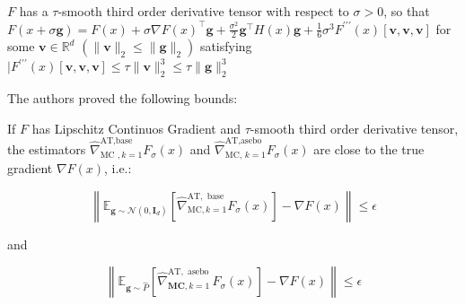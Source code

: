 \begin{algorithm}[h]
\begin{algorithmic}[1]
\EndFor

\end{algorithmic}
\end{algorithm}

\begin{defn}\label{SmoothThirdOrderDerivative}
	
	$ F $ has a $ \tau $-smooth third order derivative tensor with respect to $ \sigma>0 $, so that $ F(x+\sigma \mathbf{g})=F(x)+\sigma \nabla F(x)^{\top} \mathbf{g}+\frac{\sigma^{2}}{2} \mathbf{g}^{\top} H(x) \mathbf{g}+\frac{1}{6} \sigma^{3} F^{\prime \prime \prime}(x)[\mathbf{v}, \mathbf{v}, \mathbf{v}] $ for some $ \mathbf{v} \in \mathbb{R}^{d} $
	$ \left(\|\mathbf{v}\|_{2} \leq\|\mathbf{g}\|_{2}\right) $ satisfying $ \mid F^{\prime \prime \prime}(x)[\mathbf{v}, \mathbf{v}, \mathbf{v}] \leq \tau\|\mathbf{v}\|_{2}^{3} \leq \tau\|\mathbf{g}\|_{2}^{3} $

\end{defn}

The authors proved the following bounds:

\begin{thm}

	If $ F $ has Lipschitz Continuos Gradient and $ \tau $-smooth third order derivative tensor, the estimators $ \widehat{\nabla}_{\text {MC }, k=1}^{\text {AT,base }} F_{\sigma}(x) $ and $ \widehat{\nabla}_{\text {MC, } k=1}^{\text {AT,asebo }} F_{\sigma}(x) $ are close to the true gradient $ \nabla F(x) $, i.e.: 
	
	\begin{equation}
		\left\|\mathbb{E}_{\mathbf{g} \sim \mathcal{N}\left(0, \mathbf{I}_{d}\right)}\left[\widehat{\nabla}_{\mathrm{MC}, k=1}^{\mathrm{AT}, \text { base }} F_{\sigma}(x)\right]-\nabla F(x)\right\| \leq \epsilon
	\end{equation}

	and

	\begin{equation}
		\left\|\mathbb{E}_{\mathbf{g} \sim \widehat{P}}\left[\widehat{\nabla}_{\mathbf{M C}, k=1}^{\mathrm{AT}, \text { asebo }} F_{\sigma}(x)\right]-\nabla F(x)\right\| \leq \epsilon
	\end{equation}

\end{thm}

